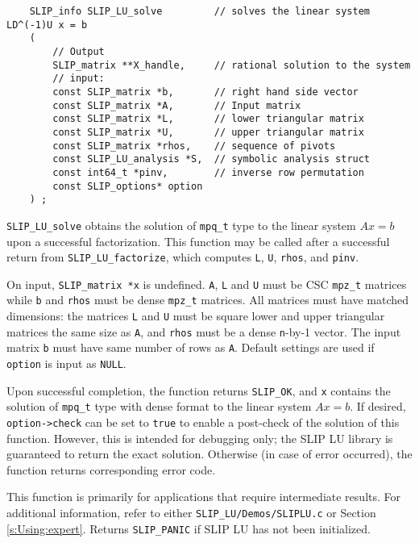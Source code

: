 \documentclass[12pt]{article}
\theoremstyle{definition}
\begin{document}
\begin{mdframed}[userdefinedwidth=6in]
{\footnotesize
\begin{verbatim}
    SLIP_info SLIP_LU_solve         // solves the linear system LD^(-1)U x = b
    (
        // Output
        SLIP_matrix **X_handle,     // rational solution to the system
        // input:
        const SLIP_matrix *b,       // right hand side vector
        const SLIP_matrix *A,       // Input matrix
        const SLIP_matrix *L,       // lower triangular matrix
        const SLIP_matrix *U,       // upper triangular matrix
        const SLIP_matrix *rhos,    // sequence of pivots
        const SLIP_LU_analysis *S,  // symbolic analysis struct
        const int64_t *pinv,        // inverse row permutation
        const SLIP_options* option
    ) ;
\end{verbatim}
} \end{mdframed}

\verb|SLIP_LU_solve| obtains the solution of \verb|mpq_t| type to the linear
system $Ax=b$ upon a successful factorization.  This function may be called
after a successful return from \verb|SLIP_LU_factorize|, which computes
\verb|L|, \verb|U|, \verb|rhos|, and \verb|pinv|. 

On input, \verb|SLIP_matrix *x| is undefined. \verb|A|, \verb|L| and \verb|U|
must be CSC \verb|mpz_t| matrices while \verb|b| and \verb|rhos| must be dense
\verb|mpz_t|  matrices. All matrices must have matched dimensions: the matrices
\verb|L| and \verb|U| must be square lower and upper triangular matrices the
same size as \verb|A|, and \verb|rhos| must be a dense \verb|n|-by-1 vector.
The input matrix \verb|b| must have same number of rows as \verb|A|.  Default
settings are used if \verb|option| is input as \verb|NULL|.

Upon successful completion, the function returns \verb|SLIP_OK|, and \verb|x|
contains the solution of \verb|mpq_t| type with dense format to the linear
system $Ax=b$. If desired, \verb|option->check| can be set to \verb|true| to
enable a post-check of the solution of this function.  However, this is
intended for debugging only; the SLIP LU library is guaranteed to return the
exact solution. Otherwise (in case of error occurred), the function returns
corresponding error code.

This function is primarily for applications that require intermediate results.
For additional information, refer to either \verb|SLIP_LU/Demos/SLIPLU.c| or
Section \ref{s:Using:expert}.  Returns \verb|SLIP_PANIC| if SLIP LU has not
been initialized.
\end{document}
